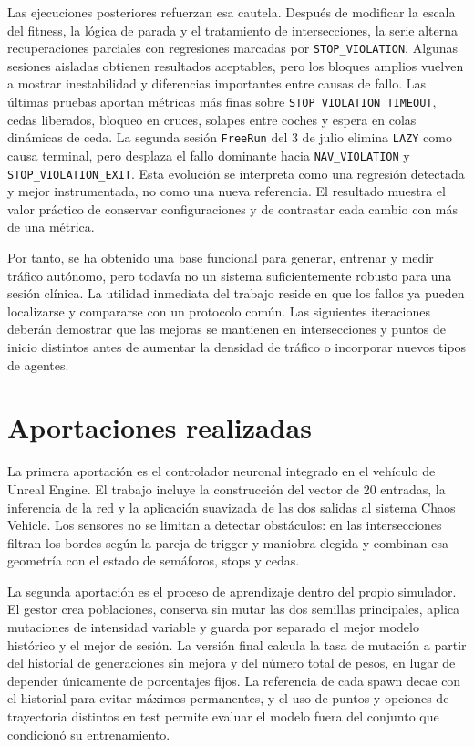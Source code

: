 Las ejecuciones posteriores refuerzan esa cautela. Después de modificar la escala del fitness, la lógica de parada y el tratamiento de intersecciones, la serie alterna recuperaciones parciales con regresiones marcadas por \texttt{STOP\_VIOLATION}. Algunas sesiones aisladas obtienen resultados aceptables, pero los bloques amplios vuelven a mostrar inestabilidad y diferencias importantes entre causas de fallo. Las últimas pruebas aportan métricas más finas sobre \texttt{STOP\_VIOLATION\_TIMEOUT}, cedas liberados, bloqueo en cruces, solapes entre coches y espera en colas dinámicas de ceda. La segunda sesión \texttt{FreeRun} del 3 de julio elimina \texttt{LAZY} como causa terminal, pero desplaza el fallo dominante hacia \texttt{NAV\_VIOLATION} y \texttt{STOP\_VIOLATION\_EXIT}. Esta evolución se interpreta como una regresión detectada y mejor instrumentada, no como una nueva referencia. El resultado muestra el valor práctico de conservar configuraciones y de contrastar cada cambio con más de una métrica.

Por tanto, se ha obtenido una base funcional para generar, entrenar y medir tráfico autónomo, pero todavía no un sistema suficientemente robusto para una sesión clínica. La utilidad inmediata del trabajo reside en que los fallos ya pueden localizarse y compararse con un protocolo común. Las siguientes iteraciones deberán demostrar que las mejoras se mantienen en intersecciones y puntos de inicio distintos antes de aumentar la densidad de tráfico o incorporar nuevos tipos de agentes.

\clearpage
\section{Aportaciones realizadas}

La primera aportación es el controlador neuronal integrado en el vehículo de Unreal Engine. El trabajo incluye la construcción del vector de 20 entradas, la inferencia de la red y la aplicación suavizada de las dos salidas al sistema Chaos Vehicle. Los sensores no se limitan a detectar obstáculos: en las intersecciones filtran los bordes según la pareja de trigger y maniobra elegida y combinan esa geometría con el estado de semáforos, stops y cedas.

La segunda aportación es el proceso de aprendizaje dentro del propio simulador. El gestor crea poblaciones, conserva sin mutar las dos semillas principales, aplica mutaciones de intensidad variable y guarda por separado el mejor modelo histórico y el mejor de sesión. La versión final calcula la tasa de mutación a partir del historial de generaciones sin mejora y del número total de pesos, en lugar de depender únicamente de porcentajes fijos. La referencia de cada spawn decae con el historial para evitar máximos permanentes, y el uso de puntos y opciones de trayectoria distintos en test permite evaluar el modelo fuera del conjunto que condicionó su entrenamiento.

